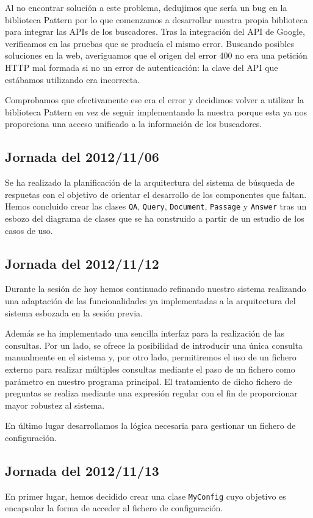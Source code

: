 \documentclass[12pt,a4paper,titlepage]{article}
\begin{document}
Al no encontrar solución a este problema, dedujimos que sería un bug en la biblioteca Pattern por lo que comenzamos a desarrollar nuestra propia biblioteca para integrar las APIs de los buscadores. Tras la integración del API de Google, verificamos en las pruebas que se producía el mismo error. Buscando posibles soluciones en la web, averiguamos que el origen del error 400 no era una petición HTTP mal formada si no un error de autenticación: la clave del API que estábamos utilizando era incorrecta.

Comprobamos que efectivamente ese era el error y decidimos volver a utilizar la biblioteca Pattern en vez de seguir implementando la nuestra porque esta ya nos proporciona una acceso unificado a la información de los buscadores.

\subsection{Jornada del 2012/11/06}
Se ha realizado la planificación de la arquitectura del sistema de búsqueda de respuetas con el objetivo de orientar el desarrollo de los componentes que faltan. Hemos concluido crear las clases \texttt{QA}, \texttt{Query}, \texttt{Document}, \texttt{Passage} y \texttt{Answer} tras un esbozo del diagrama de clases que se ha construido a partir de un estudio de los casos de uso.

\subsection{Jornada del 2012/11/12}
Durante la sesión de hoy hemos continuado refinando nuestro sistema realizando una adaptación de las funcionalidades ya implementadas a la arquitectura del sistema esbozada en la sesión previa.

Además se ha implementado una sencilla interfaz para la realización de las consultas. Por un lado, se ofrece la posibilidad de introducir una única consulta manualmente en el sistema y, por otro lado, permitiremos el uso de un fichero externo para realizar múltiples consultas mediante el paso de un fichero como parámetro en nuestro programa principal. El tratamiento de dicho fichero de preguntas se realiza mediante una expresión regular con el fin de proporcionar mayor robustez al sistema.

En último lugar desarrollamos la lógica necesaria para gestionar un fichero de configuración.

\subsection{Jornada del 2012/11/13}
En primer lugar, hemos decidido crear una clase \texttt{MyConfig} cuyo objetivo es encapsular la forma de acceder al fichero de configuración.
\end{document}
